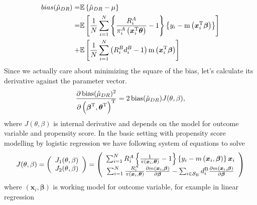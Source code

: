 \documentclass[
  letterpaper,
  DIV=11,
  numbers=noendperiod]{scrreprt}
\begin{document}
\[
\begin{aligned}
bias(\hat{\mu}_{DR}) = & \mathbb{E}\left\{\hat{\mu}_{DR} - \mu\right\} \\ = & \mathbb{E}\left[ \frac{1}{N} \sum_{i=1}^N \left\{\frac{R_i^A}{\pi_i^A \left(\boldsymbol{x}_i^{\mathrm{T}} \boldsymbol{\theta} \right)}  - 1\right\} \left\{y_i - \operatorname{m}\left( \boldsymbol{x}_i^{\mathrm{T}} \boldsymbol{\beta}\right)\right\} \right] \\ + & \mathbb{E}\left[  \frac{1}{N} \sum_{i=1}^N \left(R_i^B d_i^B - 1\right) \operatorname{m}\left( \boldsymbol{x}_i^{\mathrm{T}} \boldsymbol{\beta} \right)\right]
\end{aligned}
\] Since we actually care about minimizing the square of the bias, let's
calculate its derivative against the parameter vector. \[
\begin{aligned}
    \frac{\partial \operatorname{bias}(\hat{\mu}_{DR})^2}{\partial \left(\boldsymbol{\beta}^{\mathrm{T}}, \boldsymbol{\theta}^{\mathrm{T}}\right)^{\mathrm{T}}} = 2 \operatorname{bias}(\hat{\mu}_{DR}) J(\theta, \beta),
\end{aligned}
\] where \(J(\theta, \beta)\) is internal derivative and depends on the
model for outcome variable and propensity score. In the basic setting
with propensity score modelling by logistic regression we have following
system of equations to solve \[
\begin{equation}
\begin{aligned}
J(\theta, \beta)=\left(\begin{array}{c}
J_1(\theta, \beta) \\
J_2(\theta, \beta)
\end{array}\right)=\left(\begin{array}{c}
\sum_{i=1}^N R_i^A\left\{\frac{1}{\pi\left(\boldsymbol{x}_i, \boldsymbol{\theta}\right)}-1\right\}\left\{y_i-m\left(\boldsymbol{x}_i, \boldsymbol{\beta}\right)\right\} \boldsymbol{x}_i \\
\sum_{i=1}^N \frac{R_i^A}{\pi\left(\boldsymbol{x}_i, \boldsymbol{\theta}\right)} \frac{\partial m\left(\boldsymbol{x}_i, \boldsymbol{\beta}\right)}{\partial \bbeta}  - \sum_{i \in \mathcal{S}_{\mathrm{B}}} d_i^{\mathrm{B}} \frac{\partial m\left(\boldsymbol{x}_i, \boldsymbol{\beta}\right)}{\partial \bbeta} 
\end{array}\right)
\end{aligned}
\end{equation}
\] where \(\left(\boldsymbol{x}_i, \boldsymbol{\beta}\right)\) is
working model for outcome variable, for example in linear regression
\end{document}
